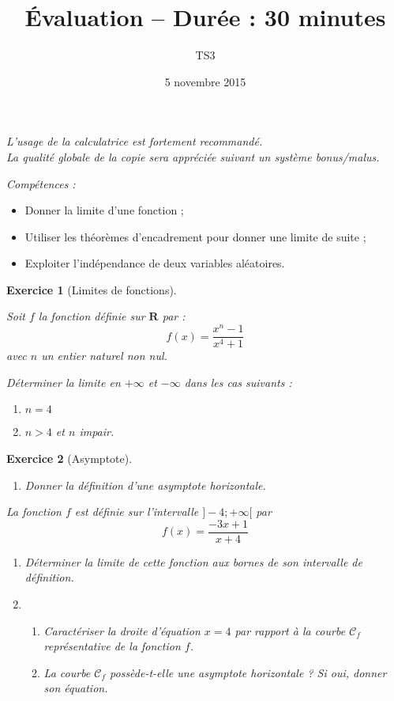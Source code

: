 \documentclass[12pt,a4paper]{article}
\title{Évaluation \no 2 -- Durée : 30 minutes}
\author{TS3}
\date{5 novembre 2015}
\makeatletter
\renewcommand{\maketitle}%
{\framebox{%
    \begin{minipage}{0.98\linewidth}%
      \begin{center}%
        \Large \@title ~-- \@author \\%
        \@date%
      \end{center}%
  \end{minipage}}%
  \normalsize%
}
\theoremstyle{break}
\theoremstyle{nobreak}
\newtheorem{exercice}{Exercice}
\theoremstyle{nonumberplain}
\newcommand{\R}{\mathbf{R}}
\makeatother
\begin{document}
\maketitle

\begin{center}
  \textit{L'usage de la calculatrice est fortement recommandé.}
  \\
  \textit{La qualité globale de la copie sera appréciée suivant un
  système bonus/malus.}
\end{center}

\emph{Compétences :}
\begin{itemize}
  \item Donner la limite d'une fonction ;
  \item Utiliser les théorèmes d'encadrement pour donner une limite de
    suite ;
  \item Exploiter l'indépendance de deux variables aléatoires.
\end{itemize}

\begin{exercice}[Limites de fonctions]~

  Soit $f$ la fonction définie sur $\R$ par : \[f(x) = \frac{x^n -
  1}{x^4 +1} \] avec $n$ un entier naturel non nul.

  Déterminer la limite en $+\infty$ et $-\infty$ dans les cas suivants :
  \begin{enumerate}
    \item $n=4$
    \item $n>4$ et $n$ impair.
  \end{enumerate}
\end{exercice}

\begin{exercice}[Asymptote]~
  \begin{enumerate}
    \item Donner la définition d'une asymptote horizontale.
  \end{enumerate}

  La fonction $f$ est définie sur l'intervalle $] -4 ; +\infty[$ par \[
  f(x) = \frac{-3x + 1}{x + 4} \]
  \begin{enumerate}[start=2]
    \item Déterminer la limite de cette fonction aux bornes de son
      intervalle de définition.
    \item \begin{enumerate}
        \item Caractériser la droite d'équation $x = 4$ par rapport à
          la courbe $\mathscr{C}_f$ représentative de la fonction $f$.
        \item La courbe $\mathscr{C}_f$ possède-t-elle une asymptote
          horizontale ? Si oui, donner son équation.
      \end{enumerate}
  \end{enumerate}
\end{exercice}
\end{document}
